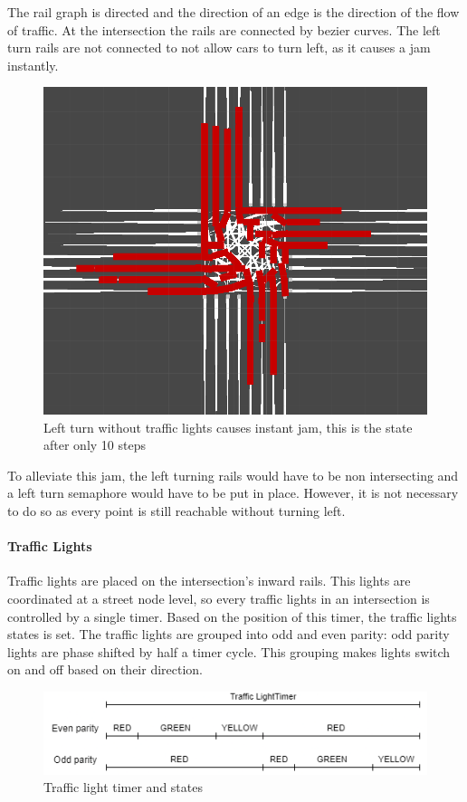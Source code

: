 \documentclass[12pt]{article}
\begin{document}
\bigskip 
 The rail graph is directed and the direction of an edge is the direction of the flow of traffic. At the intersection the rails are connected by bezier curves. The left turn rails are not connected to not allow cars to turn left, as it causes a jam instantly.
\begin{figure}[H]
\includegraphics[width=\textwidth]{gridlock}
\caption{Left turn without traffic lights causes instant jam, this is the state after only 10 steps}
\end{figure}
\bigskip 
 To alleviate this jam, the left turning rails would have to be non intersecting and a left turn semaphore would have to be put in place. However, it is not necessary to do so as every point is still reachable without turning left.

\paragraph{Traffic Lights}
Traffic lights are placed on the intersection's inward rails. This lights are coordinated at a street node level, so every traffic lights in an intersection is controlled by a single timer. Based on the position of this timer, the traffic lights states is set. The traffic lights are grouped into odd and even parity: odd parity lights are phase shifted by half a timer cycle. This grouping makes lights switch on and off based on their direction.
\begin{figure}[H]
\includegraphics[width=\textwidth]{semaphore}
\caption{Traffic light timer and states}
\end{figure}
\end{document}
